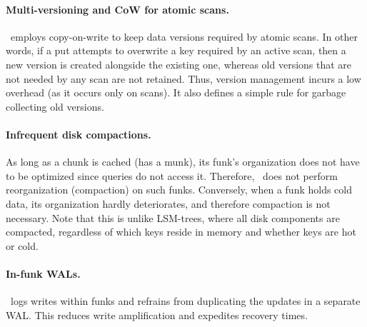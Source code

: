 \paragraph{Multi-versioning and CoW for atomic scans.} \sys\ employs copy-on-write to keep data versions required by atomic scans. 
In other words, if a put attempts to overwrite a key  required by an active scan, then a new version is created alongside the 
existing one, whereas old versions that are not needed by any scan are not retained. 
Thus, version management incurs a low overhead (as it occurs only on scans). It also defines a simple rule for garbage collecting old versions.
\paragraph{Infrequent disk compactions.} 
As long as a chunk is cached (has a munk), its funk's organization does not have to be optimized since 
queries do not access it. Therefore, \sys\ does not perform reorganization (compaction) on such funks.
Conversely, when a funk holds cold data, its organization hardly deteriorates, and therefore compaction is not necessary.
Note that this is unlike LSM-trees, where all disk components are compacted, regardless of which keys reside in memory and whether 
keys are hot or cold. 

\paragraph{In-funk WALs.} \sys\ logs writes within funks and refrains from duplicating the updates  in a separate WAL. This reduces write amplification and expedites recovery times. 
